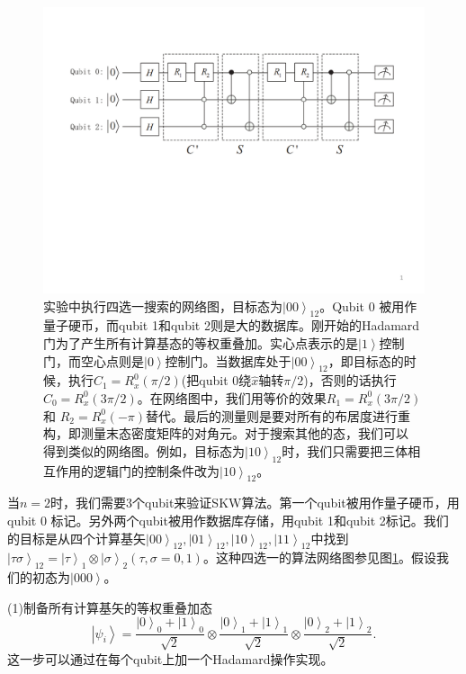 \begin{figure}[htbp]
            \begin{center}
              \includegraphics[width= 0.8\columnwidth]{figures/rwnet.pdf}
              \caption{实验中执行四选一搜索的网络图，目标态为$\left\vert 00
\right\rangle_{12}$。Qubit 0 被用作量子硬币，而qubit 1和qubit 2则是大的数据库。刚开始的Hadamard门为了产生所有计算基态的等权重叠加。实心点表示的是$\left\vert 1 \right\rangle$控制门，而空心点则是$\left\vert 0 \right\rangle$控制门。当数据库处于$\left\vert 00
\right\rangle_{12}$，即目标态的时候，执行$C_1=R_x^0(\pi/2)$(把qubit 0绕$\hat{x}$轴转$\pi/2$)，否则的话执行$C_0=R_x^0(3\pi/2)$。在网络图中，我们用等价的效果$R_1=R_x^0(3\pi/2)$和
$R_2=R_x^0(-\pi)$替代。最后的测量则是要对所有的布居度进行重构，即测量末态密度矩阵的对角元。对于搜索其他的态，我们可以
得到类似的网络图。例如，目标态为$\left\vert 10
\right\rangle_{12}$时，我们只需要把三体相互作用的逻辑门的控制条件改为$\left\vert 10
\right\rangle_{12}$。  }\label{rwnet}
            \end{center}
 \end{figure}

当$n=2$时，我们需要3个qubit来验证SKW算法。第一个qubit被用作量子硬币，用qubit 0 标记。另外两个qubit被用作数据库存储，用qubit 1和qubit 2标记。我们的目标是从四个计算基矢${\left\vert 00 \right\rangle_{12},\left\vert 01
\right\rangle_{12},\left\vert 10 \right\rangle_{12},\left\vert 11
\right\rangle_{12}}$中找到$\left\vert \tau\sigma \right\rangle_{12} =
\left\vert \tau \right\rangle_{1}\otimes\left\vert \sigma
\right\rangle_{2} \left(\tau,\sigma=0,1 \right)$。这种四选一的算法网络图参见图\ref{rwnet}。假设我们的初态为$\left\vert 000 \right\rangle$。

(1)制备所有计算基矢的等权重叠加态
\begin{equation} \label{initial}
\left\vert \psi_{i} \right\rangle=\frac{\left\vert 0 \right\rangle_0+\left\vert 1 \right\rangle_0}{\sqrt{2}}\otimes\frac{\left\vert 0 \right\rangle_1+\left\vert 1 \right\rangle_1}{\sqrt{2}}\otimes\frac{\left\vert 0 \right\rangle_2+\left\vert 1 \right\rangle_2}{\sqrt{2}}.
\end{equation}
这一步可以通过在每个qubit上加一个Hadamard操作实现。

